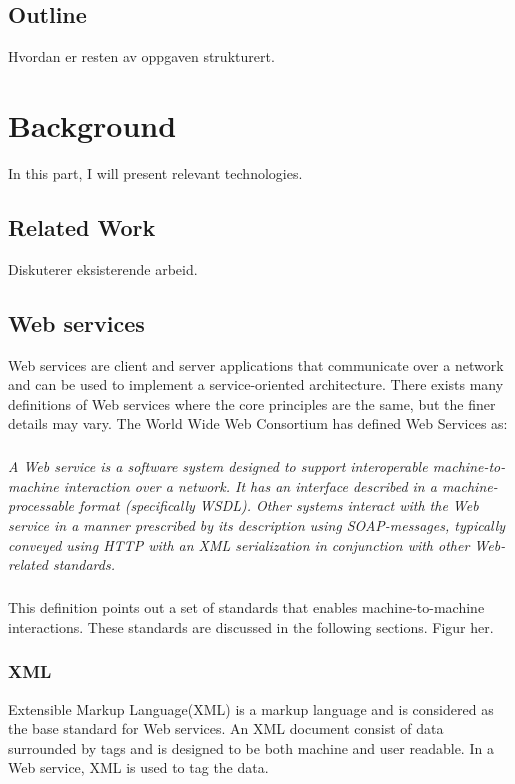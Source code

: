 \documentclass[USenglish]{ifimaster}
\begin{document}
\section{Outline}
Hvordan er resten av oppgaven strukturert.


\chapter{Background}
In this part, I will present relevant technologies.
\section{Related Work}
Diskuterer eksisterende arbeid.



\section{Web services}
\label{web-services}
Web services are client and server applications that communicate over a network
and can be used to implement a service-oriented architecture. There exists many
definitions of Web services where the core principles are the same, but the
finer details may vary. The World Wide Web Consortium has defined Web Services
as\cite{wrc-web-service}:
\paragraph{}
\textit{
    A Web service is a software system designed to support interoperable
    machine-to-machine interaction over a network. It has an interface described in
    a machine-processable format (specifically WSDL). Other systems interact with
    the Web service in a manner prescribed by its description using SOAP-messages,
    typically conveyed using HTTP with an XML serialization in conjunction with
    other Web-related standards.
}

\paragraph{}
This definition points out a set of standards that enables machine-to-machine
interactions. These standards are discussed in the following sections.
Figur her.

\subsection{XML}
Extensible Markup Language(XML) is a markup language and is considered as the
base standard for Web services. An XML document consist of data surrounded by
tags and is designed to be both machine and user readable. In a Web service, XML
is used to tag the data. 
\end{document}
